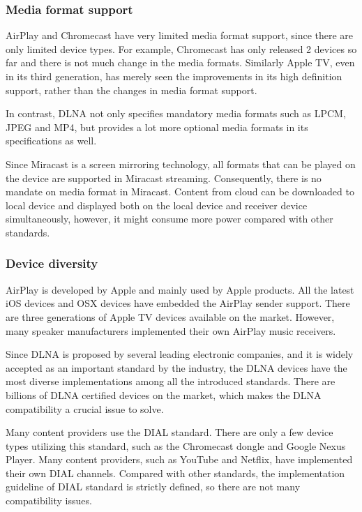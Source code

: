 \subsubsection{Media format support\label{2_3_3_1}} 
AirPlay and Chromecast have very limited media format support, since there are 
only limited device types. For example, Chromecast has only released 2 devices
so far and there is not much change in the media formats. Similarly Apple TV,
even in its third generation,  has merely seen the improvements in its high
definition support, rather than the changes in media format support.

In contrast, DLNA not only specifies mandatory media formats such as LPCM, JPEG
and MP4, but provides a lot more optional media formats in its specifications
as well.

Since Miracast is a screen mirroring technology, all formats that can be played
on the device are supported in Miracast streaming. Consequently, there is no
mandate on media format in Miracast. Content from
cloud can be downloaded to local device and displayed both on the local device
and receiver device simultaneously, however, it might consume more power
compared with other standards. 
\subsubsection{Device diversity\label{2_3_3_3}}
AirPlay is developed by Apple and mainly used by Apple products. All the latest
iOS devices and OSX devices have embedded the AirPlay sender support. There are
three generations of Apple TV devices available on the market. However,
many speaker manufacturers implemented their own AirPlay music
receivers.

Since DLNA is proposed by several leading electronic companies, and it is
widely accepted as an important standard by the industry, the DLNA devices have
the most diverse implementations among all the introduced standards. There are
billions of DLNA certified devices on the market, which makes the DLNA
compatibility a crucial issue to solve.

Many content providers use the DIAL standard. There are only a few device types
utilizing this standard, such as the Chromecast dongle and Google Nexus Player.
Many content providers, such as YouTube and Netflix, have implemented their own
DIAL channels. Compared with other standards, the implementation guideline of
DIAL standard is strictly defined, so there are not many compatibility issues.

